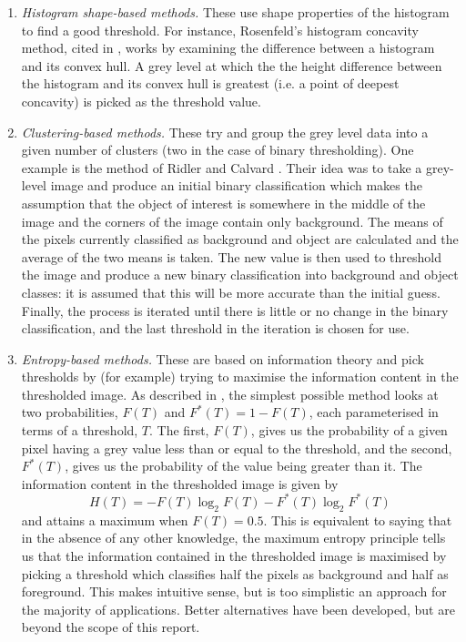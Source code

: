 \begin{enumerate}

\item \emph{Histogram shape-based methods.} These use shape properties of the histogram to find a good threshold. For instance, Rosenfeld's histogram concavity method, cited in \cite{lee.c92}, works by examining the difference between a histogram and its convex hull. A grey level at which the the height difference between the histogram and its convex hull is greatest (i.e. a point of deepest concavity) is picked as the threshold value.

\item \emph{Clustering-based methods.} These try and group the grey level data into a given number of clusters (two in the case of binary thresholding). One example is the method of Ridler and Calvard \cite{ridler78}. Their idea was to take a grey-level image and produce an initial binary classification which makes the assumption that the object of interest is somewhere in the middle of the image and the corners of the image contain only background. The means of the pixels currently classified as background and object are calculated and the average of the two means is taken. The new value is then used to threshold the image and produce a new binary classification into background and object classes: it is assumed that this will be more accurate than the initial guess. Finally, the process is iterated until there is little or no change in the binary classification, and the last threshold in the iteration is chosen for use.

\item \emph{Entropy-based methods.} These are based on information theory and pick thresholds by (for example) trying to maximise the information content in the thresholded image. As described in \cite{wong89}, the simplest possible method looks at two probabilities, $F(T)$ and $F^*(T) = 1 - F(T)$, each parameterised in terms of a threshold, $T$. The first, $F(T)$, gives us the probability of a given pixel having a grey value less than or equal to the threshold, and the second, $F^*(T)$, gives us the probability of the value being greater than it. The information content in the thresholded image is given by
%
\[
H(T) = -F(T) \log_2 F(T) - F^*(T) \log_2 F^*(T)
\]
%
and attains a maximum when $F(T) = 0.5$. This is equivalent to saying that in the absence of any other knowledge, the maximum entropy principle tells us that the information contained in the thresholded image is maximised by picking a threshold which classifies half the pixels as background and half as foreground. This makes intuitive sense, but is too simplistic an approach for the majority of applications. Better alternatives have been developed, but are beyond the scope of this report.




\end{enumerate}

